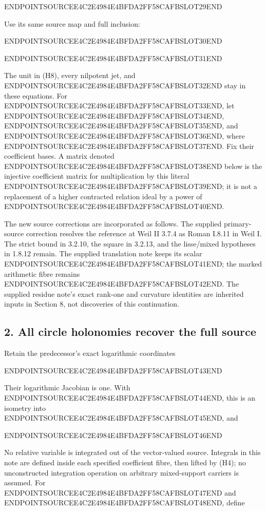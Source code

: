 ENDPOINTSOURCEE4C2E4984E4BFDA2FF58CAFBSLOT29END

Use its same source map and full inclusion:

ENDPOINTSOURCEE4C2E4984E4BFDA2FF58CAFBSLOT30END

ENDPOINTSOURCEE4C2E4984E4BFDA2FF58CAFBSLOT31END

The unit in (H8), every nilpotent jet, and ENDPOINTSOURCEE4C2E4984E4BFDA2FF58CAFBSLOT32END stay in these equations. For ENDPOINTSOURCEE4C2E4984E4BFDA2FF58CAFBSLOT33END, let ENDPOINTSOURCEE4C2E4984E4BFDA2FF58CAFBSLOT34END, ENDPOINTSOURCEE4C2E4984E4BFDA2FF58CAFBSLOT35END, and ENDPOINTSOURCEE4C2E4984E4BFDA2FF58CAFBSLOT36END, where ENDPOINTSOURCEE4C2E4984E4BFDA2FF58CAFBSLOT37END. Fix their coefficient bases. A matrix denoted ENDPOINTSOURCEE4C2E4984E4BFDA2FF58CAFBSLOT38END below is the injective coefficient matrix for multiplication by this literal ENDPOINTSOURCEE4C2E4984E4BFDA2FF58CAFBSLOT39END; it is not a replacement of a higher contracted relation ideal by a power of ENDPOINTSOURCEE4C2E4984E4BFDA2FF58CAFBSLOT40END.

The new source corrections are incorporated as follows. The supplied primary-source correction resolves the reference at Weil II 3.7.4 as Roman I.8.11 in Weil I. The strict bound in 3.2.10, the square in 3.2.13, and the lisse/mixed hypotheses in 1.8.12 remain. The supplied translation note keeps its scalar ENDPOINTSOURCEE4C2E4984E4BFDA2FF58CAFBSLOT41END; the marked arithmetic fibre remains ENDPOINTSOURCEE4C2E4984E4BFDA2FF58CAFBSLOT42END. The supplied residue note's exact rank-one and curvature identities are inherited inputs in Section 8, not discoveries of this continuation.

\subsection{2. All circle holonomies recover the full source}\label{endpoint-holonomy_original--all-circle-holonomies-recover-the-full-source}

Retain the predecessor's exact logarithmic coordinates

ENDPOINTSOURCEE4C2E4984E4BFDA2FF58CAFBSLOT43END

Their logarithmic Jacobian is one. With ENDPOINTSOURCEE4C2E4984E4BFDA2FF58CAFBSLOT44END, this is an isometry into ENDPOINTSOURCEE4C2E4984E4BFDA2FF58CAFBSLOT45END, and

ENDPOINTSOURCEE4C2E4984E4BFDA2FF58CAFBSLOT46END

No relative variable is integrated out of the vector-valued source. Integrals in this note are defined inside each specified coefficient fibre, then lifted by (H4); no unconstructed integration operation on arbitrary mixed-support carriers is assumed. For ENDPOINTSOURCEE4C2E4984E4BFDA2FF58CAFBSLOT47END and ENDPOINTSOURCEE4C2E4984E4BFDA2FF58CAFBSLOT48END, define


